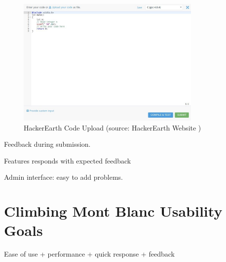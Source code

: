 \begin{figure}
    \centering
    \includegraphics[width=0.8\textwidth]{figs/hackerearth_upload.jpg}
    \caption[HackerEarth Code Upload]{HackerEarth Code Upload (source: HackerEarth Website \cite{HACKEREARTH})}
    \label{fig:hackerearth-upload}
\end{figure}

Feedback during submission.

Features responds with expected feedback

Admin interface: easy to add problems.

\section{Climbing Mont Blanc Usability Goals}
\label{sec:cmb-usability}
Ease of use + performance + quick response + feedback
